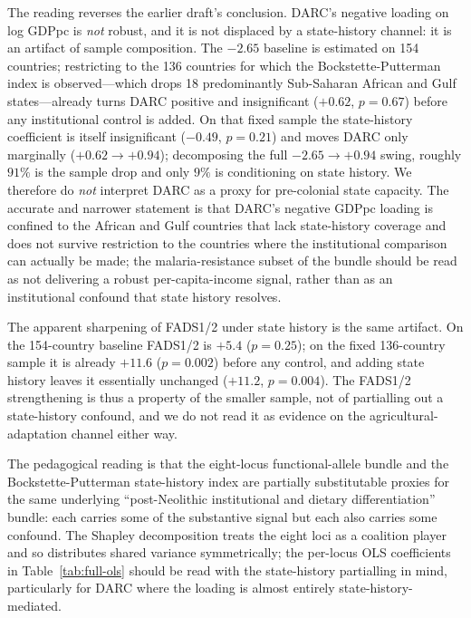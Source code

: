 \documentclass[11pt,letterpaper]{article}
\begin{document}
The reading reverses the earlier draft's conclusion. DARC's negative loading on log GDPpc is \emph{not} robust, and it is not displaced by a state-history channel: it is an artifact of sample composition. The $-2.65$ baseline is estimated on 154 countries; restricting to the 136 countries for which the Bockstette-Putterman index is observed---which drops 18 predominantly Sub-Saharan African and Gulf states---already turns DARC positive and insignificant ($+0.62$, $p=0.67$) before any institutional control is added. On that fixed sample the state-history coefficient is itself insignificant ($-0.49$, $p=0.21$) and moves DARC only marginally ($+0.62 \to +0.94$); decomposing the full $-2.65 \to +0.94$ swing, roughly $91\%$ is the sample drop and only $9\%$ is conditioning on state history. We therefore do \emph{not} interpret DARC as a proxy for pre-colonial state capacity. The accurate and narrower statement is that DARC's negative GDPpc loading is confined to the African and Gulf countries that lack state-history coverage and does not survive restriction to the countries where the institutional comparison can actually be made; the malaria-resistance subset of the bundle should be read as not delivering a robust per-capita-income signal, rather than as an institutional confound that state history resolves.

The apparent sharpening of FADS1/2 under state history is the same artifact. On the 154-country baseline FADS1/2 is $+5.4$ ($p=0.25$); on the fixed 136-country sample it is already $+11.6$ ($p=0.002$) before any control, and adding state history leaves it essentially unchanged ($+11.2$, $p=0.004$). The FADS1/2 strengthening is thus a property of the smaller sample, not of partialling out a state-history confound, and we do not read it as evidence on the agricultural-adaptation channel either way.

The pedagogical reading is that the eight-locus functional-allele bundle and the Bockstette-Putterman state-history index are partially substitutable proxies for the same underlying ``post-Neolithic institutional and dietary differentiation'' bundle: each carries some of the substantive signal but each also carries some confound. The Shapley decomposition treats the eight loci as a coalition player and so distributes shared variance symmetrically; the per-locus OLS coefficients in Table~\ref{tab:full-ols} should be read with the state-history partialling in mind, particularly for DARC where the loading is almost entirely state-history-mediated.
\end{document}
